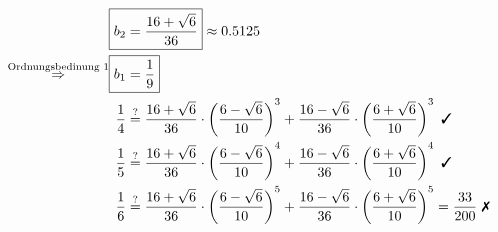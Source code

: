 \begin{align}
   \Aboxed{b_2 &= \frac{16+\sqrt{6}}{36}} \approx 0.5125\\
   \stackrel{\text{Ordnungsbedinung 1}}{\Rightarrow} \Aboxed{b_1 &= \frac{1}{9}}\\
    \frac{1}{4} &\stackrel{?}{=} \frac{16+\sqrt{6}}{36} \cdot \left (\frac{6-\sqrt{6}}{10} \right )^3 + \frac{16-\sqrt{6}}{36} \cdot \left (\frac{6+\sqrt{6}}{10} \right)^3 \text{ \cmark}\\
    \frac{1}{5} &\stackrel{?}{=} \frac{16+\sqrt{6}}{36} \cdot \left (\frac{6-\sqrt{6}}{10} \right )^4 + \frac{16-\sqrt{6}}{36} \cdot \left (\frac{6+\sqrt{6}}{10} \right)^4 \text{ \cmark}\\
    \frac{1}{6} &\stackrel{?}{=} \frac{16+\sqrt{6}}{36} \cdot \left (\frac{6-\sqrt{6}}{10} \right )^5 + \frac{16-\sqrt{6}}{36} \cdot \left (\frac{6+\sqrt{6}}{10} \right)^5 = \frac{33}{200} \text{ \xmark}
\end{align}
